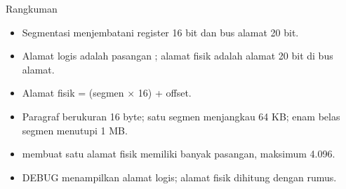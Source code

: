 \documentclass[aspectratio=169,11pt]{beamer}
\begin{document}
\begin{frame}{Rangkuman}
\small
\begin{itemize}
    \item Segmentasi menjembatani register 16 bit dan bus alamat
          20 bit.

    \vspace{0.15em}
    \item Alamat logis adalah pasangan ;
          alamat fisik adalah alamat 20 bit di bus alamat.

    \vspace{0.15em}
    \item Alamat fisik = (segmen $\times$ 16) + offset.

    \vspace{0.15em}
    \item Paragraf berukuran 16 byte; satu segmen menjangkau
          64 KB; enam belas segmen menutupi 1 MB.

    \vspace{0.15em}
    \item {} membuat satu alamat fisik memiliki
          banyak pasangan, maksimum 4.096.

    \vspace{0.15em}
    \item DEBUG menampilkan alamat logis; alamat fisik dihitung
          dengan rumus.
\end{itemize}
\end{frame}
\end{document}
